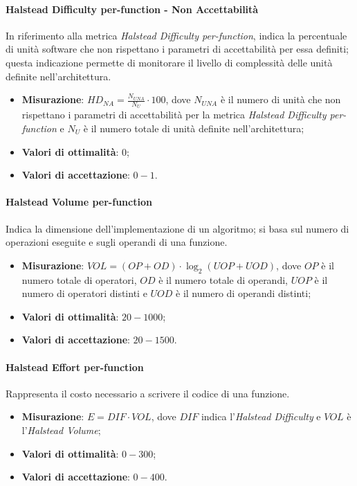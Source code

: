 \paragraph{Halstead Difficulty per-function - Non Accettabilità}
\label{halDiffNA}
In riferimento alla metrica \textit{Halstead Difficulty per-function}, indica la percentuale di unità software che non rispettano i parametri di accettabilità per essa definiti; questa indicazione permette di monitorare il livello di complessità delle unità definite nell'architettura.
\begin{itemize}
\item \textbf{Misurazione}: $HD_{NA}=\frac{N_{UNA}}{N_{U}} \cdot 100$, dove $N_{UNA}$ è il numero di unità che non rispettano i parametri di accettabilità per la metrica \textit{Halstead Difficulty per-function} e $N_{U}$ è il numero totale di unità definite nell'architettura;
\item \textbf{Valori di ottimalità}: $0$;
\item \textbf{Valori di accettazione}: $0 - 1$.
\end{itemize}
\paragraph{Halstead Volume per-function}
\label{halVolume}
Indica la dimensione dell'implementazione di un algoritmo; si basa sul numero di operazioni eseguite e sugli operandi di una funzione.
\begin{itemize}
\item \textbf{Misurazione}: $VOL = (OP + OD) \cdot \log_{2}(UOP + UOD)$, dove $OP$ è il numero totale di operatori, $OD$ è il numero totale di operandi, $UOP$ è il numero di operatori distinti e $UOD$ è il numero di operandi distinti;
\item \textbf{Valori di ottimalità}: $20 - 1000$;
\item \textbf{Valori di accettazione}: $20 - 1500$.
\end{itemize}
\paragraph{Halstead Effort per-function}
\label{halEffort}
Rappresenta il costo necessario a scrivere il codice di una funzione.
\begin{itemize}
\item \textbf{Misurazione}: $E = DIF \cdot VOL$, dove $DIF$ indica l'\textit{Halstead Difficulty} e $VOL$ è l'\textit{Halstead Volume};
\item \textbf{Valori di ottimalità}: $0 - 300$;
\item \textbf{Valori di accettazione}: $0 - 400$.
\end{itemize}
